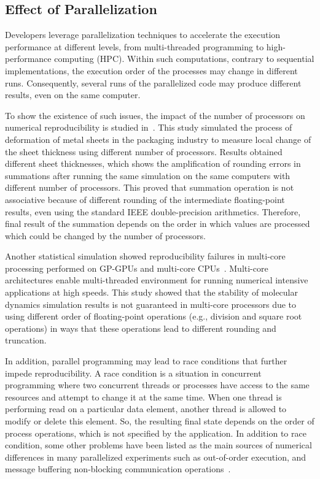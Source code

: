 \subsection{Effect of Parallelization}

Developers leverage parallelization techniques to accelerate the 
execution performance at different levels, from multi-threaded programming to 
high-performance computing (HPC). Within such computations, contrary to 
sequential implementations, the execution order of the processes may 
change in different runs. Consequently, several runs of the 
parallelized code may produce different 
results, even on the same computer. 

To show the existence of such issues, the impact of the number of 
processors on numerical reproducibility is studied 
in~\cite{diethelm2012limits}. This study simulated the process of 
deformation of metal sheets in the packaging industry to measure local 
change of the sheet thickness using different number of processors. 
Results obtained different sheet thicknesses, which shows the 
amplification of rounding errors in summations after running the same 
simulation on the same computers with different number of processors. 
This proved that summation operation is not associative because of 
different rounding of the intermediate floating-point results, even 
using the standard IEEE double-precision arithmetics. Therefore, final 
result of the summation depends on the order in which values are 
processed which could be changed by the number of processors. 

Another statistical simulation showed reproducibility failures in 
multi-core processing performed on GP-GPUs and multi-core 
CPUs~\cite{taufer2010improving}. Multi-core architectures enable 
multi-threaded environment for running numerical intensive applications 
at high speeds. This study showed that the stability of molecular 
dynamics simulation results is not guaranteed in multi-core processors 
due to using different order of floating-point operations (e.g., 
division and square root operations) in ways that these operations lead 
to different rounding and truncation. 

In addition, parallel programming may lead to race conditions that 
further impede reproducibility. A race condition is a situation in 
concurrent programming where two concurrent threads or processes have 
access to the same resources and attempt to change it at the same time. 
When one thread is performing read on a particular data element, 
another thread is allowed to modify or delete this element. So, the 
resulting final state depends on the order of process operations, which 
is not specified by the application. In addition to race condition, 
some other problems have been listed as the main sources of numerical 
differences in many parallelized experiments such as out-of-order 
execution, and message buffering non-blocking communication 
operations~\cite{revol2013numerical}. 

